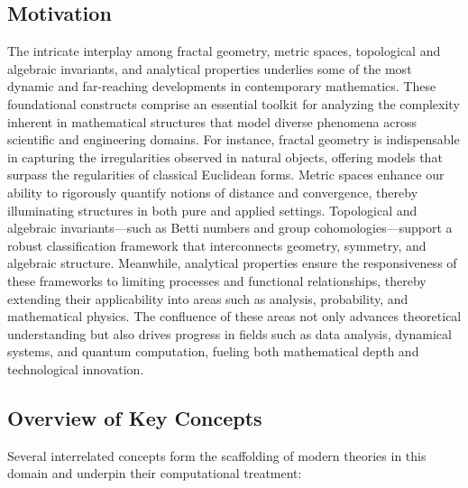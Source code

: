 \subsection{Motivation}

The intricate interplay among fractal geometry, metric spaces, topological and algebraic invariants, and analytical properties underlies some of the most dynamic and far-reaching developments in contemporary mathematics. These foundational constructs comprise an essential toolkit for analyzing the complexity inherent in mathematical structures that model diverse phenomena across scientific and engineering domains. For instance, fractal geometry is indispensable in capturing the irregularities observed in natural objects, offering models that surpass the regularities of classical Euclidean forms. Metric spaces enhance our ability to rigorously quantify notions of distance and convergence, thereby illuminating structures in both pure and applied settings. Topological and algebraic invariants—such as Betti numbers and group cohomologies—support a robust classification framework that interconnects geometry, symmetry, and algebraic structure. Meanwhile, analytical properties ensure the responsiveness of these frameworks to limiting processes and functional relationships, thereby extending their applicability into areas such as analysis, probability, and mathematical physics. The confluence of these areas not only advances theoretical understanding but also drives progress in fields such as data analysis, dynamical systems, and quantum computation, fueling both mathematical depth and technological innovation.

\subsection{Overview of Key Concepts}

Several interrelated concepts form the scaffolding of modern theories in this domain and underpin their computational treatment:

